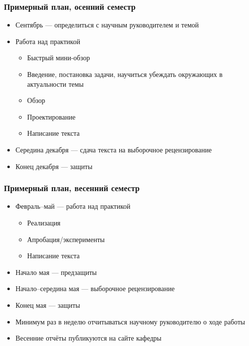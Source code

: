 \documentclass[xetex,mathserif,serif]{beamer}
\begin{document}
    \begin{frame}
        \frametitle{Примерный план, осенний семестр}
        \begin{itemize}
            \item Сентябрь --- определиться с научным руководителем и темой
            \item Работа над практикой
            \begin{itemize}
                \item Быстрый мини-обзор
                \item Введение, постановка задачи, научиться убеждать окружающих в актуальности темы
                \item Обзор
                \item Проектирование
                \item Написание текста
            \end{itemize}
            \item Середина декабря --- сдача текста на выборочное рецензирование
            \item Конец декабря --- защиты
        \end{itemize}
    \end{frame}

    \begin{frame}
        \frametitle{Примерный план, весенний семестр}
        \begin{itemize}
            \item Февраль--май --- работа над практикой
            \begin{itemize}
                \item Реализация
                \item Апробация/эксперименты
                \item Написание текста
            \end{itemize}
            \item Начало мая --- предзащиты
            \item Начало--середина мая --- выборочное рецензирование
            \item Конец мая --- защиты
            \item Минимум раз в неделю отчитываться научному руководителю о ходе работы
            \item Весенние отчёты публикуются на сайте кафедры
        \end{itemize}
    \end{frame}
\end{document}
